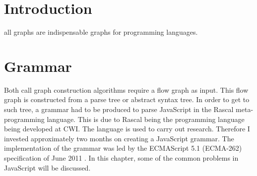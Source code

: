 \documentclass[journal,10pt]{IEEEtran} %
\begin{document}
\section{Introduction}
all graphs are indispensable graphs for programming languages.
\section{Grammar}
Both call graph construction algorithms require a flow graph as input. This flow graph is constructed from a parse tree or abstract syntax tree. In order to get to such tree, a grammar had to be produced to parse JavaScript in the Rascal meta-programming language. This is due to Rascal being the programming language being developed at CWI. The language is used to carry out research. Therefore I invested approximately two months on creating a JavaScript grammar. The implementation of the grammar was led by the ECMAScript 5.1 (ECMA-262) specification of June 2011 \cite{ecmascriptspecs}. In this chapter, some of the common problems in JavaScript will be discussed.
\end{document}
